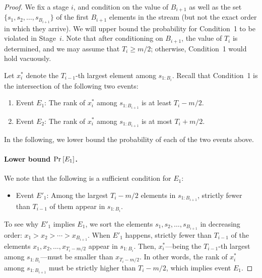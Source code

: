 \begin{proof}
We fix a stage $i$, and condition on the value of $B_{i+1}$ as well as the set $\{s_1, s_2, \ldots, s_{B_{i+1}}\}$ of the first $B_{i+1}$ elements in the stream (but not the exact order in which they arrive). We will upper bound the probability for Condition~1 to be violated in Stage~$i$. Note that after conditioning on $B_{i+1}$, the value of $T_i$ is determined, and we may assume that $T_i \ge m / 2$; otherwise, Condition~1 would hold vacuously.

Let $x_i^*$ denote the $T_{i-1}$-th largest element among $s_{1:B_i}$. Recall that Condition~1 is the intersection of the following two events:
\begin{enumerate}
    \item Event $E_1$: The rank of $x^*_i$ among $s_{1:B_{i+1}}$ is at least $T_i - m/2$.
    \item Event $E_2$: The rank of $x^*_i$ among $s_{1:B_{i+1}}$ is at most $T_i + m/2$.
\end{enumerate}
In the following, we lower bound the probability of each of the two events above.

\paragraph{Lower bound $\Pr_{}\left[E_1\right]$.} We note that the following is a sufficient condition for $E_1$:
\begin{itemize}
    \item Event $E'_1$: Among the largest $T_i - m/2$ elements in $s_{1:B_{i+1}}$, strictly fewer than $T_{i-1}$ of them appear in $s_{1:B_i}$.
\end{itemize}
To see why $E'_1$ implies $E_1$, we sort the elements $s_1, s_2, \ldots, s_{B_{i+1}}$ in decreasing order: $x_1 > x_2 > \cdots > x_{B_{i+1}}$. When $E'_1$ happens, strictly fewer than $T_{i-1}$ of the elements $x_1, x_2, \ldots, x_{T_i - m/2}$ appear in $s_{1:B_i}$. Then, $x_i^*$---being the $T_{i-1}$-th largest among $s_{1:B_i}$---must be smaller than $x_{T_i - m/2}$. In other words, the rank of $x^*_i$ among $s_{1:B_{i+1}}$ must be strictly higher than $T_i - m/2$, which implies event $E_1$. 


\end{proof}
